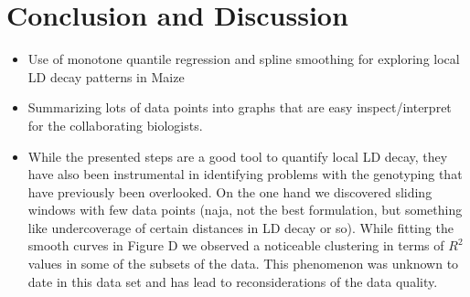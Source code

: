\documentclass[twoside]{report}
\begin{document}
\section{Conclusion and Discussion}

\begin{itemize}
\item Use of monotone quantile regression and spline smoothing for exploring 
	local LD decay patterns in Maize
\item Summarizing lots of data points into graphs that are easy inspect/interpret for the 
	collaborating biologists.
\item While the presented steps are a good tool to quantify local LD decay, they have also been 
	instrumental in identifying problems with the genotyping that have previously been 
	overlooked. On the one hand we discovered sliding windows with few data points (naja, not 
	the best formulation, but something like undercoverage of certain distances in LD decay 
	or so). While fitting the smooth curves in Figure D we observed a noticeable clustering 
	in terms of $R^2$ values in some of the subsets of the data. This phenomenon was unknown 
	to date in this data set and has lead to reconsiderations of the data quality.
\end{itemize}


%
%

%
\end{document}
